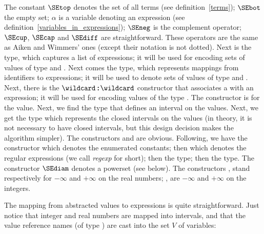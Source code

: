 \begin{Def}[Expressions]
The constant $\SEtop$ denotes the set of all terms (see
definition~\ref{terms}); $\SEbot$ the empty set; $\alpha$ is a
variable denoting an expression (see
definition~\ref{variables_in_expressions}); $\SEneg$ is the complement
operator; $\SEcup$, $\SEcap$ and $\SEdiff$ are straightforward. These
operators are the same as Aiken and Wimmers' ones (except their
notation is not dotted). Next is the  type,
which captures a list of expressions; it will be used for encoding
sets of \ASN values of type \kwdSETOF{} and \kwdSEQUENCEOF. Next comes
the  type, which represents mappings from
identifiers to expressions; it will be used to denote sets of \ASN
values of type \kwdSET{} and \kwdSEQUENCE. Next, there is the
$\wildcard\pmb{:}\!\wildcard$ constructor that associates a
 with an expression; it will be used for encoding
values of the \ASN{} type \kwdCHOICE. The \kwdNULL{} constructor is
for the \kwdNULL{} value. Next, we find the
 type that defines an interval on the
\kwdREAL{} values. Next, we get the
 type which represents the closed
intervals on the \kwdINTEGER{} values (in theory, it is not necessary
to have closed intervals, but this design decision makes the algorithm
simpler). The constructors \kwdTRUE{} and \kwdFALSE{} are
obvious. Following, we have the \Enum{} constructor which denotes the
enumerated constants; then \Regexp{} which denotes the \ASN regular
expressions (we call \emph{regexp} for short); then the
 type; then the  type. The
constructor $\SEdiam$ denotes a powerset (see below). The constructors
\MinInfReal, \PlusInfReal{} stand respectively for $-\infty$ and
$+\infty$ on the \ASN real numbers; \MinInfInt, \PlusInfInt{} are
$-\infty$ and $+\infty$ on the integers.
\end{Def}

The mapping from abstracted values to expressions is quite
straightforward. Just notice that integer and real numbers are mapped
into intervals, and that the value reference names (of type
) are cast into the set $V$ of variables:

